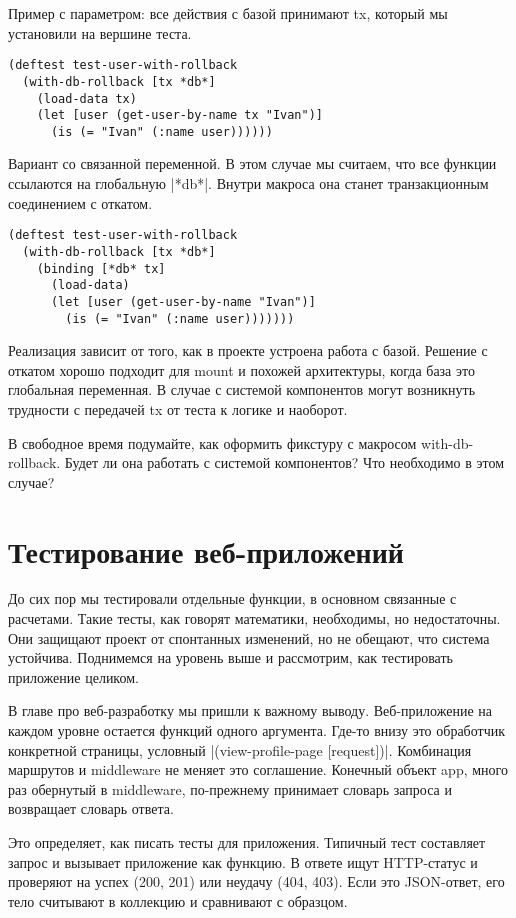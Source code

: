 Пример с параметром: все действия с базой принимают tx, который мы установили на
вершине теста.

\begin{verbatim}
(deftest test-user-with-rollback
  (with-db-rollback [tx *db*]
    (load-data tx)
    (let [user (get-user-by-name tx "Ivan")]
      (is (= "Ivan" (:name user))))))
\end{verbatim}

Вариант со связанной переменной. В этом случае мы считаем, что все функции
ссылаются на глобальную \spverb|*db*|. Внутри макроса она станет транзакционным
соединением с откатом.

\begin{verbatim}
(deftest test-user-with-rollback
  (with-db-rollback [tx *db*]
    (binding [*db* tx]
      (load-data)
      (let [user (get-user-by-name "Ivan")]
        (is (= "Ivan" (:name user)))))))
\end{verbatim}

Реализация зависит от того, как в проекте устроена работа с базой. Решение с
откатом хорошо подходит для mount и похожей архитектуры, когда база это
глобальная переменная. В случае с системой компонентов могут возникнуть
трудности с передачей tx от теста к логике и наоборот.

В свободное время подумайте, как оформить фикстуру с макросом
with-db-rollback. Будет ли она работать с системой компонентов? Что необходимо в
этом случае?

\section{Тестирование веб-приложений}

До сих пор мы тестировали отдельные функции, в основном связанные с
расчетами. Такие тесты, как говорят математики, необходимы, но недостаточны. Они
защищают проект от спонтанных изменений, но не обещают, что система
устойчива. Поднимемся на уровень выше и рассмотрим, как тестировать приложение
целиком.

В главе про веб-разработку мы пришли к важному выводу. Веб-приложение на каждом
уровне остается функций одного аргумента. Где-то внизу это обработчик конкретной
страницы, условный \spverb|(view-profile-page [request])|. Комбинация маршрутов и
middleware не меняет это соглашение. Конечный объект app, много раз обернутый в
middleware, по-прежнему принимает словарь запроса и возвращает словарь ответа.

Это определяет, как писать тесты для приложения. Типичный тест составляет запрос
и вызывает приложение как функцию. В ответе ищут HTTP-статус и проверяют на
успех (200, 201) или неудачу (404, 403). Если это JSON-ответ, его тело считывают
в коллекцию и сравнивают с образцом.

